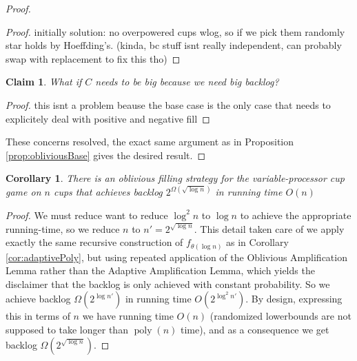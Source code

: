 \documentclass[twocolumn]{article}[11pt]
\DeclareMathOperator{\poly}{\text{poly}}
\newtheorem{clm}{Claim}
\newtheorem{corollary}{Corollary}
\begin{document}
\begin{proof}
\begin{proof}
    initially solution: no overpowered cups wlog, so if we pick them randomly star holds
    by Hoeffding's. (kinda, bc stuff isnt really independent, can probably swap
    with replacement to fix this tho)
  
\end{proof}
\begin{clm}
  What if $C$ needs to be big because we need big backlog? 
\end{clm}
\begin{proof}
 this isnt a problem beause the base case is the only case that needs to explicitely deal with positive and negative fill
\end{proof}
These concerns resolved, the exact same argument as in Proposition
\ref{prop:obliviousBase} gives the desired result.

\end{proof}

\begin{corollary}
  There is an oblivious filling strategy for the variable-processor cup game on
  $n$ cups that achieves backlog $2^{\Omega(\sqrt{\log n})}$ in running time
  $O(n)$
\end{corollary}
\begin{proof}
  We must reduce want to reduce $\log^2 n$ to $\log n$ to achieve the
  appropriate running-time, so we reduce $n$ to $n' = 2^{\sqrt{\log n}}$. This
  detail taken care of we apply exactly the same recursive construction of
  $f_{\theta(\log n)}$ as in Corollary \ref{cor:adaptivePoly}, but using
  repeated application of the Oblivious Amplification Lemma rather than the
  Adaptive Amplification Lemma, which yields the disclaimer that the backlog is
  only achieved with constant probability.
  So we achieve backlog $\Omega(2^{\log n'})$ in running time $O(2^{\log^2
  n'})$. By design, expressing this in terms of $n$ we have running time $O(n)$
  (randomized lowerbounds are not supposed to take longer than $\poly(n)$
  time), and as a consequence we get backlog $\Omega(2^{\sqrt{\log n}})$.
\end{proof}
\end{document}
